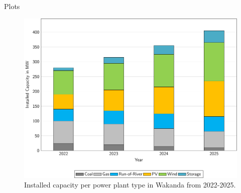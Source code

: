 \documentclass[aspectratio=169]{beamer}
\begin{document}
\begin{frame}{Plots}
\begin{minipage}[t]{0.49\textwidth}
\begin{coloredblock}
\begin{itemize}
                \end{itemize}
        \end{coloredblock}
    \end{minipage}
    \hfill
    \begin{minipage}[t]{0.49\textwidth}
        \vspace{1cm}
        \tiny
        \begin{overprint}
            \begin{figure}[htbp]
                \includegraphics[width=\linewidth]{figures/installed_capacity_2022-2025.pdf}
                \caption{\centering Installed capacity per power plant type in Wakanda from 2022-2025.}
                \label{fig:installed_capacity}
        \end{figure}


\end{overprint}
\end{minipage}
\end{frame}
\end{document}
